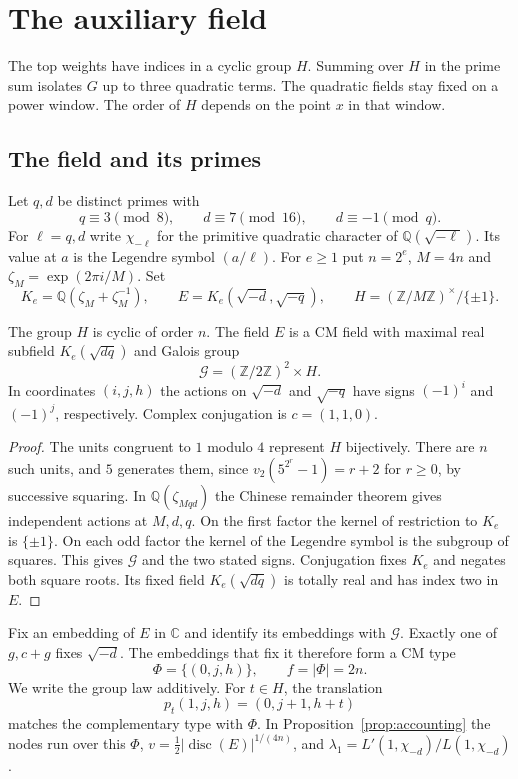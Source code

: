 \section{The auxiliary field}\label{sec:auxiliary-field}

The top weights have indices in a cyclic group $H$. Summing over $H$ in
the prime sum isolates $G$ up to three quadratic terms. The quadratic
fields stay fixed on a power window. The order of $H$ depends on the
point $x$ in that window.

\subsection{The field and its primes}

Let $q,d$ be distinct primes with
\[
  q\equiv3\pmod 8,\qquad d\equiv7\pmod{16},\qquad d\equiv-1\pmod q.
\]
For $\ell=q,d$ write $\chi_{-\ell}$ for the primitive quadratic
character of $\mathbb Q(\sqrt{-\ell})$. Its value at $a$ is the
Legendre symbol $(a/\ell)$. For $e\ge1$ put $n=2^e$, $M=4n$ and
$\zeta_M=\exp(2\pi i/M)$. Set
\[
  K_e=\mathbb Q(\zeta_M+\zeta_M^{-1}),\qquad
  E=K_e(\sqrt{-d},\sqrt{-q}),\qquad
  H=(\mathbb Z/M\mathbb Z)^\times/\{\pm1\}.
\]

\begin{proposition}\label{prop:aux-field}
The group $H$ is cyclic of order $n$. The field $E$ is a CM field with
maximal real subfield $K_e(\sqrt{dq})$ and Galois group
\[
  \mathcal G=(\mathbb Z/2\mathbb Z)^2\times H.
\]
In coordinates $(i,j,h)$ the actions on $\sqrt{-d}$ and $\sqrt{-q}$
have signs $(-1)^i$ and $(-1)^j$, respectively. Complex conjugation
is $c=(1,1,0)$.
\end{proposition}

\begin{proof}
The units congruent to $1$ modulo $4$ represent $H$ bijectively.
There are $n$ such units, and $5$ generates them, since
$v_2(5^{2^r}-1)=r+2$ for $r\ge0$, by successive squaring.
In $\mathbb Q(\zeta_{Mqd})$ the Chinese remainder theorem gives
independent actions at $M,d,q$. On the first factor the kernel of
restriction to $K_e$ is $\{\pm1\}$. On each odd factor the kernel
of the Legendre symbol is the subgroup of squares. This gives
$\mathcal G$ and the two stated signs. Conjugation fixes $K_e$ and
negates both square roots. Its fixed field $K_e(\sqrt{dq})$ is totally
real and has index two in $E$.
\end{proof}

Fix an embedding of $E$ in $\mathbb C$ and identify its embeddings with
$\mathcal G$. Exactly one of $g,c+g$ fixes $\sqrt{-d}$. The embeddings
that fix it therefore form a CM type
\[
  \Phi=\{(0,j,h)\},\qquad f=|\Phi|=2n.
\]
We write the group law additively. For $t\in H$, the translation
\[
  p_t(1,j,h)=(0,j+1,h+t)
\]
matches the complementary type with $\Phi$. In
Proposition~\ref{prop:accounting} the nodes run over this $\Phi$,
$v=\tfrac12|\operatorname{disc}(E)|^{1/(4n)}$, and
$\lambda_1=L'(1,\chi_{-d})/L(1,\chi_{-d})$.


